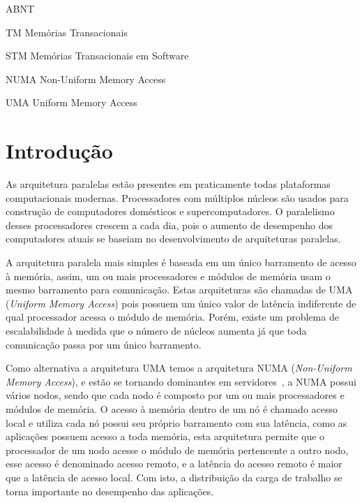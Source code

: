 \documentclass[diss,capa]{texufpel}
\begin{document}
\listoffigures

\listoftables

\begin{listofabbrv}{ABNT}%
        \item[TM] Memórias Transacionais
        \item[STM] Memórias Transacionais em Software
        \item[NUMA] Non-Uniform Memory Access
        \item[UMA] Uniform Memory Access
\end{listofabbrv}

\tableofcontents

\chapter{Introdução}

As arquitetura paralelas estão presentes em praticamente todas plataformas computacionais modernas. Processadores com múltiplos núcleos são usados para construção de computadores domésticos e supercomputadores. O paralelismo desses processadores crescem a cada dia, pois o aumento de desempenho dos computadores atuais se baseiam no desenvolvimento de arquiteturas paralelas.

A arquitetura paralela mais simples é baseada em um único barramento de acesso à memória, assim, um ou mais processadores e módulos de memória usam o mesmo barramento para comunicação. Estas arquiteturas são chamadas de UMA (\emph{Uniform Memory Access}) pois possuem um único valor de latência indiferente de qual processador acessa o módulo de memória. Porém, existe um problema de escalabilidade à medida que o número de núcleos aumenta já que toda comunicação passa por um único barramento.

Como alternativa a arquitetura UMA temos a arquitetura NUMA (\emph{Non-Uniform Memory Access}), e estão se tornando dominantes em servidores~\cite{Calciu:2017}, a NUMA possui vários nodos, sendo que cada nodo é composto por um ou mais processadores e módulos de memória. O acesso à memória dentro de um nó é chamado acesso local e utiliza cada nó possui seu próprio barramento com sua latência, como as aplicações possuem acesso a toda memória, esta arquitetura permite que o processador de um nodo acesse o módulo de memória pertencente a outro nodo, esse acesso é denominado acesso remoto, e a latência do acesso remoto é maior que a latência de acesso local. Com isto, a distribuição da carga de trabalho se torna importante no desempenho das aplicações.
\end{document}
